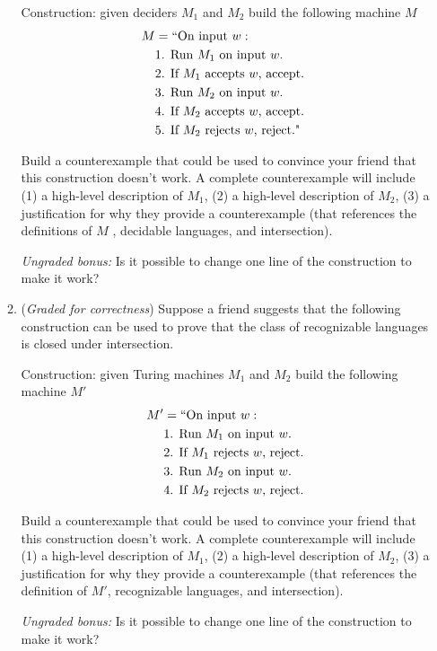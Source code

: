 \documentclass[12pt, oneside]{article}
\newcommand{\gradeCorrect}{({\it Graded for correctness}) }
\begin{document}
\begin{enumerate}[wide, labelwidth=!, labelindent=0pt]
\begin{enumerate}
Construction: given deciders $M_1$ and $M_2$ build the following machine $M$
\begin{align*}
    M &= ``\text{On input }w:\\
     &\text{1. Run $M_1$ on input $w$.}\\
     &\text{2. If $M_1$ accepts $w$, accept. } \\
     &\text{3. Run $M_2$ on input $w$.} \\
     &\text{4. If $M_2$ accepts $w$, accept.}\\
     &\text{5. If $M_2$ rejects $w$, reject."}\\
 \end{align*}

 Build a counterexample that could be used to convince your friend that this 
 construction doesn't work. A complete counterexample will include (1) a high-level description of $M_1$, (2) a high-level description of $M_2$, (3) a justification for why they provide a counterexample (that references
 the definitions of $M$ , decidable languages, and intersection).

 {\it Ungraded bonus:} Is it possible to change one line of the construction to make it work?

 \item\gradeCorrect
 Suppose a friend suggests that the following construction can be used
 to prove that the class of recognizable languages is closed under intersection.
 
 Construction: given Turing machines $M_1$ and $M_2$ build the following machine $M'$
\begin{align*}
    M' &= ``\text{On input }w:\\
     &\text{1. Run $M_1$ on input $w$.}\\
     &\text{2. If $M_1$ rejects $w$, reject.} \\
     &\text{3. Run $M_2$ on input $w$.} \\
     &\text{4. If $M_2$ rejects $w$, reject.}\\
 \end{align*}

 Build a counterexample that could be used to convince your friend that this 
 construction doesn't work. A complete counterexample will include (1) a high-level description of $M_1$, (2) a high-level description of $M_2$, (3) a justification for why they provide a counterexample (that references the definition of $M'$, recognizable languages, and intersection).


 {\it Ungraded bonus:} Is it possible to change one line of the construction to make it work?
\end{enumerate}


\end{enumerate}
\end{document}
